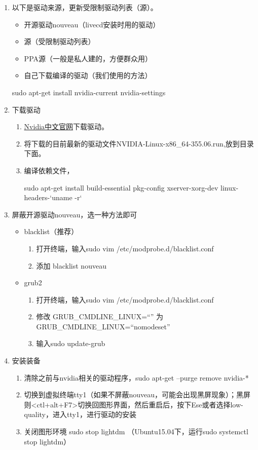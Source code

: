 \begin{enumerate}
\item 以下是驱动来源，更新受限制驱动列表（源）。
\begin{itemize}
\item 开源驱动nouveau（livecd安装时用的驱动）
\item 源（受限制驱动列表）
\item PPA源（一般是私人建的，方便群众用）
\item 自己下载编译的驱动（我们使用的方法）
\end{itemize}
\begin{bash}
sudo apt-get install nvidia-current nvidia-settings
\end{bash}
\item 下载驱动
	\begin{enumerate}
	\item \href{http://www.nvidia.cn/page/home.html}{Nvidia中文官网}下载驱动。
	\item 将下载的目前最新的驱动文件NVIDIA-Linux-x86\_64-355.06.run,放到{\color{blue}{/home/用户名/}}目录下面。
	\item 编译依赖文件，
	\begin{bash}
	sudo apt-get install build-essential pkg-config xserver-xorg-dev linux-headers-`uname -r`
	\end{bash}
	\end{enumerate}
\item 屏蔽开源驱动nouveau，选一种方法即可
	\begin{itemize}
	\item blacklist（推荐）
	    \begin{enumerate}
	    \item 打开终端，输入sudo vim /etc/modprobe.d/blacklist.conf
	    \item 添加 blacklist nouveau
	    \end{enumerate}
	\item grub2
	    \begin{enumerate}
	    \item 打开终端，输入sudo vim /etc/modprobe.d/blacklist.conf
	    \item 修改 GRUB\_CMDLINE\_LINUX=``'' 为 GRUB\_CMDLINE\_LINUX=``nomodeset''
	    \item 输入sudo update-grub
	    \end{enumerate}	
	\end{itemize}
\item 安装装备
	\begin{enumerate}
	\item 清除之前与nvidia相关的驱动程序，sudo apt-get --purge remove nvidia-*  
	\item <ctl+alt+F1>切换到虚拟终端tty1（如果不屏蔽nouveau，可能会出现黑屏现象）；黑屏则<ctl+alt+F7>切换回图形界面，然后重启后，按下Ese或者选择low-quality，进入tty1，进行驱动的安装
	\item 关闭图形环境  sudo stop lightdm （Ubuntu15.04下，运行sudo systemctl stop lightdm）
	\end{enumerate}


\end{enumerate}
